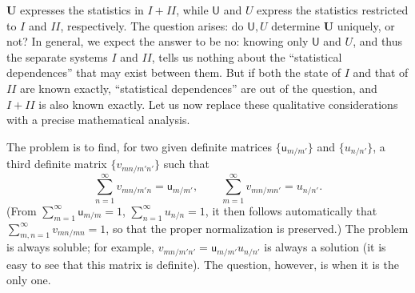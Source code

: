 \documentclass[fontsize=13pt,twoside,openany,headings=normal,parskip=false,bookmarkpackage=false,DIV=calc]{scrbook}
\begin{document}
$\boldsymbol U$ expresses the statistics in $I+II$, while $\mathsf U$ and $U$ express the statistics restricted to $I$ and $II$, respectively. The question arises: do $\mathsf U,U$ determine $\boldsymbol U$ uniquely, or not? In general, we expect the answer to be no: knowing only $\mathsf U$ and $U$, and thus the separate systems $I$ and $II$, tells us nothing about the ``statistical dependences'' that may exist between them. But if both the state of $I$ and that of $II$ are known exactly, ``statistical dependences'' are out of the question, and $I+II$ is also known exactly. Let us now replace these qualitative considerations with a precise mathematical analysis.

The problem is to find, for two given definite matrices $\{\mathsf u_{m/m'}\}$ and $\{u_{n/n'}\}$, a third definite matrix $\{v_{mn/m'n'}\}$ such that
\[
 \sum_{n=1}^{\infty}v_{mn/m'n}=\mathsf u_{m/m'},\qquad
 \sum_{m=1}^{\infty}v_{mn/mn'}=u_{n/n'}.
\]
(From $\sum_{m=1}^{\infty}\mathsf u_{m/m}=1$, $\sum_{n=1}^{\infty}u_{n/n}=1$, it then follows automatically that $\sum_{m,n=1}^{\infty}v_{mn/mn}=1$, so that the proper normalization is preserved.) The problem is always soluble; for example, $v_{mn/m'n'}=\mathsf u_{m/m'}u_{n/n'}$ is always a solution (it is easy to see that this matrix is definite). The question, however, is when it is the only one.
\end{document}
